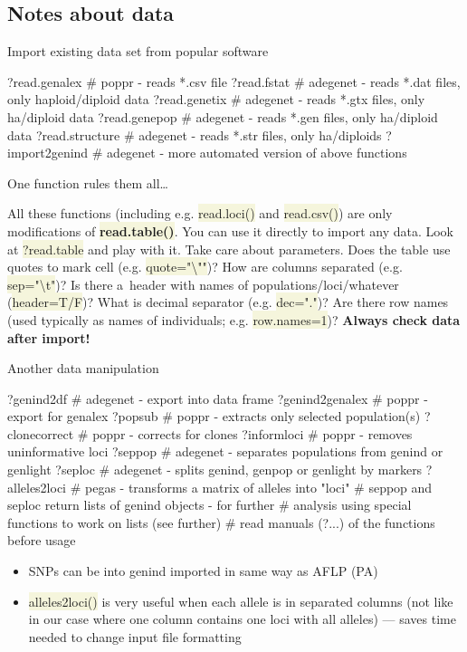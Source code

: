 \documentclass[compress, xelatex, 11pt, xcolor=svgnames, aspectratio=169, url={hyphens, lowtilde}]{beamer}
\renewcommand{\texttt}[1]{\colorbox{Beige}{{\ttfamily #1}}}
\begin{document}
\subsection{Notes about data}

\begin{frame}[fragile]{Import existing data set from popular software}
	\begin{spluscode}
    ?read.genalex # poppr - reads *.csv file
    ?read.fstat # adegenet - reads *.dat files, only haploid/diploid data
    ?read.genetix # adegenet - reads *.gtx files, only ha/diploid data
    ?read.genepop # adegenet - reads *.gen files, only ha/diploid data
    ?read.structure # adegenet - reads *.str files, only ha/diploids
    ?import2genind # adegenet - more automated version of above functions
	\end{spluscode}
	\begin{alertblock}{One function rules them all\ldots}
		\begin{footnotesize}
			All these functions (including e.g. \texttt{read.loci()} and \texttt{read.csv()}) are only modifications of \textbf{\texttt{read.table()}}. You can use it directly to import any data. Look at \texttt{?read.table} and play with it. Take care about parameters. Does the table use quotes to mark cell (e.g. \texttt{quote="\textbackslash ""})? How are columns separated (e.g. \texttt{sep="\textbackslash t"})? Is there a~header with names of populations/loci/whatever (\texttt{header=T/F})? What is decimal separator (e.g. \texttt{dec="."})? Are there row names (used typically as names of individuals; e.g. \texttt{row.names=1})? \alert{\textbf{Always check data after import!}}
		\end{footnotesize}
	\end{alertblock}
\end{frame}

\begin{frame}[fragile]{Another data manipulation}
	\begin{spluscode}
    ?genind2df # adegenet - export into data frame
    ?genind2genalex # poppr - export for genalex
    ?popsub # poppr - extracts only selected population(s)
    ?clonecorrect # poppr - corrects for clones
    ?informloci # poppr - removes uninformative loci
    ?seppop # adegenet - separates populations from genind or genlight
    ?seploc # adegenet - splits genind, genpop or genlight by markers
    ?alleles2loci # pegas - transforms a matrix of alleles into "loci"
    # seppop and seploc return lists of genind objects - for further
    # analysis using special functions to work on lists (see further)
    # read manuals (?...) of the functions before usage
	\end{spluscode}
	\begin{itemize}
		\item SNPs can be into genind imported in same way as AFLP (PA)
		\item \texttt{alleles2loci()} is very useful when each allele is in separated columns (not like in our case where one column contains one loci with all alleles) --- saves time needed to change input file formatting
	\end{itemize}
\end{frame}
\end{document}
